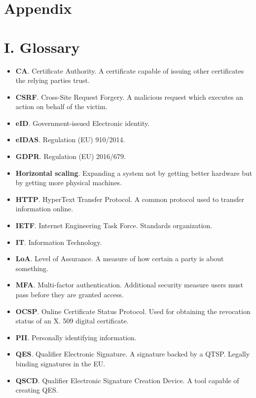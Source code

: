 \section*{Appendix}

\section*{I. Glossary}
\label{appendix:glossary}

\begin{itemize}
    \item \textbf{CA}. Certificate Authority. A certificate capable of issuing other certificates the relying parties trust.
    \item \textbf{CSRF}. Cross-Site Request Forgery. A malicious request which executes an action on behalf of the victim.
    \item \textbf{eID}. Government-issued Electronic identity.
    \item \textbf{eIDAS}. Regulation (EU) 910/2014.
    \item \textbf{GDPR}. Regulation (EU) 2016/679.
    \item \textbf{Horizontal scaling}. Expanding a system not by getting better hardware but by getting more physical machines.
    \item \textbf{HTTP}. HyperText Transfer Protocol. A common protocol used to transfer information online.
    \item \textbf{IETF}. Internet Engineering Task Force. Standards organization.
    \item \textbf{IT}. Information Technology.
    \item \textbf{LoA}. Level of Assurance. A measure of how certain a party is about something.
    \item \textbf{MFA}. Multi-factor authentication. Additional security measure users must pass before they are granted access.
    \item \textbf{OCSP}. Online Certificate Status Protocol. Used for obtaining the revocation status of an X. 509 digital certificate.
    \item \textbf{PII}. Personally identifying information.
    \item \textbf{QES}. Qualifier Electronic Signature. A signature backed by a QTSP. Legally binding signatures in the EU.
    \item \textbf{QSCD}. Qualifier Electronic Signature Creation Device. A tool capable of creating QES.

\end{itemize}
